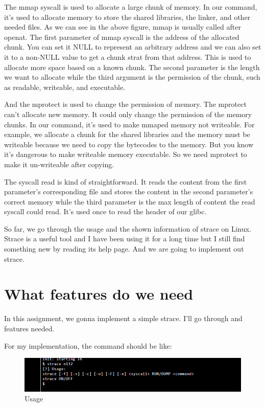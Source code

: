 \documentclass[11pt,oneside,a4paper]{article}
\begin{document}
The mmap syscall is used to allocate a large chunk of memory. In our command, 
it's used to allocate memory to store the shared libraries, the linker, and other 
needed files. As we can see in the above figure, mmap is usually called after openat.
The first parameter of mmap syscall is the address of the allocated chunk. You can 
set it NULL to represent an arbitrary address and we can also set it to a non-NULL value
to get a chunk strat from that address. This is used to allocate more space based 
on a known chunk. The second parameter is the length we want to allocate while the third
argument is the permission of the chunk, such as readable, writeable, and executable.

And the mprotect is used to change the permission of memory. The mprotect can't 
allocate new memory. It could only change the permission of the memory chunks. 
In our command, it's used to make mmaped memory not writeable. For example, we 
allocate a chunk for the shared libraries and the memory must be writeable because
we need to copy the bytecodes to the memory. But you know it's dangerous to make writeable
memory executable. So we need mprotect to make it un-writeable after copying.

The syscall read is kind of straightforward. It reads the content from the first parameter's
corresponding file and stores the content in the second parameter's correct memory while the third
parameter is the max length of content the read syscall could read. It's used once to 
read the header of our glibc.

So far, we go through the usage and the shown information of strace on Linux.
Strace is a useful tool and I have been using it for a long time but I still 
find something new by reading its help page. And we are going to implement 
out strace.

\section{What features do we need}

In this assignment, we gonna implement a simple strace. I'll go through and features 
needed. 

For my implementation, the command should be like:

\begin{figure}[H]
    \includegraphics[width=4.75in]{1-4.png}
    \centering
    \caption{Usage}
\end{figure}
\end{document}
